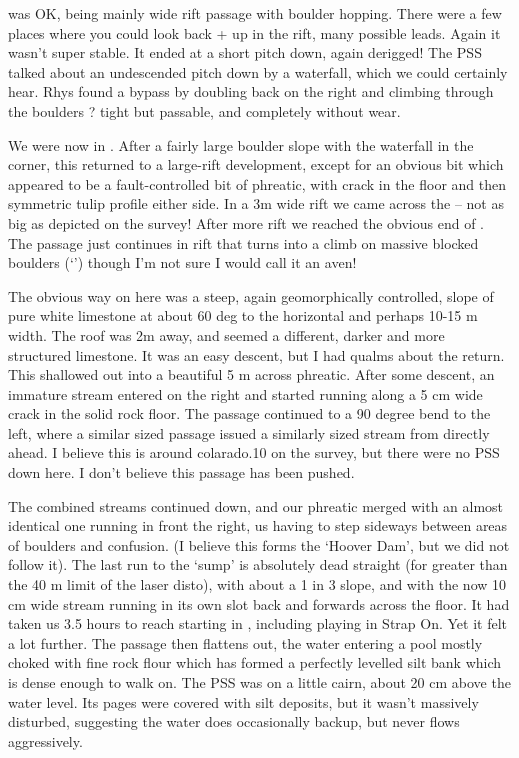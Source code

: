  was OK, being mainly wide rift passage with boulder hopping. There were a few places where you could look back + up in the rift, many possible leads. Again it wasn't super stable. It ended at a short pitch down, again derigged! The PSS talked about an undescended pitch down by a waterfall, which we could certainly hear.
Rhys found a bypass by doubling back on the right and climbing through the boulders ? tight but passable, and completely without wear.

We were now in . After a fairly large boulder slope with the waterfall in the corner, this returned to a large-rift development, except for an obvious bit which appeared to be a fault-controlled bit of phreatic, with crack in the floor and then symmetric tulip profile either side. In a 3m wide rift we came across the  -- not as big as depicted on the survey!
After more rift we reached the obvious end of . The passage just continues in rift that turns into a climb on massive blocked boulders (`') though I'm not sure I would call it an aven!

The obvious way on here was a steep, again geomorphically controlled, slope of pure white limestone at about 60 deg to the horizontal and perhaps 10-15 m width. The roof was 2m away, and seemed a different, darker and more structured limestone. It was an easy descent, but I had qualms about the return.
This shallowed out into a beautiful 5 m across phreatic. After some descent, an immature stream entered on the right and started running along a 5 cm wide crack in the solid rock floor. The passage continued to a 90 degree bend to the left, where a similar sized passage issued a similarly sized stream from directly ahead. I believe this is around colarado.10 on the survey, but there were no PSS down here. I don't believe this passage has been pushed.

The combined streams continued down, and our phreatic merged with an almost identical one running in front the right, us having to step sideways between areas of boulders and confusion. (I believe this forms the `Hoover Dam', but we did not follow it).
The last run to the `sump' is absolutely dead straight (for greater than the 40 m limit of the laser disto), with about a 1 in 3 slope, and with the now 10 cm wide stream running in its own slot back and forwards across the floor. It had taken us 3.5 hours to reach  starting in , including playing in Strap On. Yet it felt a lot further.
The passage then flattens out, the water entering a pool mostly choked with fine rock flour which has formed a perfectly levelled silt bank which is dense enough to walk on. The PSS was on a little cairn, about 20 cm above the water level. Its pages were covered with silt deposits, but it wasn't massively disturbed, suggesting the water does occasionally backup, but never flows aggressively.

